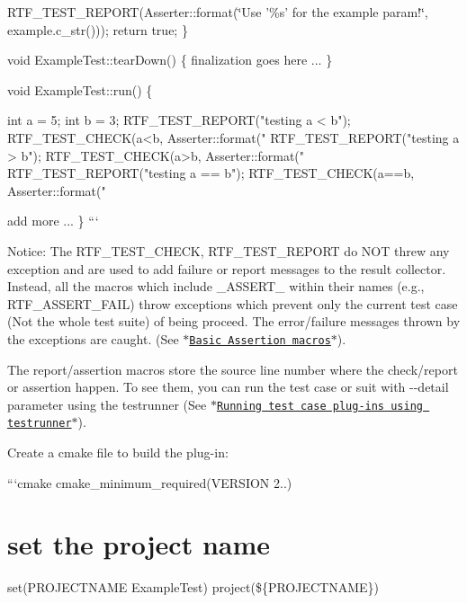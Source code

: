 R\-T\-F\-\_\-\-T\-E\-S\-T\-\_\-\-R\-E\-P\-O\-R\-T(Asserter\-::format(\char`\"{}\-Use '\%s' for the example param!\char`\"{}, example.\-c\-\_\-str())); return true; \}

void Example\-Test\-::tear\-Down() \{ finalization goes here ... \}

void Example\-Test\-::run() \{ \begin{DoxyVerb}int a = 5; int b = 3;
RTF_TEST_REPORT("testing a < b");
RTF_TEST_CHECK(a<b, Asserter::format("%
RTF_TEST_REPORT("testing a > b");
RTF_TEST_CHECK(a>b, Asserter::format("%
RTF_TEST_REPORT("testing a == b");
RTF_TEST_CHECK(a==b, Asserter::format("%
\end{DoxyVerb}
 add more ... \} ```

Notice\-: The {\ttfamily R\-T\-F\-\_\-\-T\-E\-S\-T\-\_\-\-C\-H\-E\-C\-K}, {\ttfamily R\-T\-F\-\_\-\-T\-E\-S\-T\-\_\-\-R\-E\-P\-O\-R\-T} do N\-O\-T threw any exception and are used to add failure or report messages to the result collector. Instead, all the macros which include {\ttfamily \-\_\-\-A\-S\-S\-E\-R\-T\-\_\-} within their names (e.\-g., {\ttfamily R\-T\-F\-\_\-\-A\-S\-S\-E\-R\-T\-\_\-\-F\-A\-I\-L}) throw exceptions which prevent only the current test case (Not the whole test suite) of being proceed. The error/failure messages thrown by the exceptions are caught. (See \href{http://robotology.github.io/robot-testing/documentation/TestAssert_8h.html}{\tt $\ast$\-Basic Assertion macros$\ast$}).

The report/assertion macros store the source line number where the check/report or assertion happen. To see them, you can run the test case or suit with {\ttfamily -\/-\/detail} parameter using the {\ttfamily testrunner} (See \href{http://robotology.github.io/robot-testing/documentation/testrunner.html}{\tt $\ast$\-Running test case plug-\/ins using testrunner$\ast$}).

Create a cmake file to build the plug-\/in\-:

```cmake cmake\-\_\-minimum\-\_\-required(V\-E\-R\-S\-I\-O\-N 2..)

\section*{set the project name}

set(\-P\-R\-O\-J\-E\-C\-T\-N\-A\-M\-E Example\-Test) project(\$\{P\-R\-O\-J\-E\-C\-T\-N\-A\-M\-E\})

